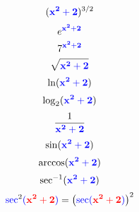 \documentclass{siproblemset}
\newcommand{\inside}{\mathbf{\color{blue} x^2+2}}
\begin{document}
    \Large
    \begin{multicols}{3}\noindent
        $$(\inside)^{3/2}$$
        \tinysp
        $$e^{\inside}$$
        \tinysp
        $$7^{\inside}$$
        \tinysp
        $$\sqrt{\inside}$$
        \columnbreak
        $$\ln(\inside)$$
        \tinysp
        $$\log_2(\inside)$$
        \tinysp
        $$\dfrac{1}{\inside}$$
        \columnbreak
        $$\sin(\inside)$$
        \tinysp
        $$\arccos(\inside)$$
        \tinysp
        $$\sec^{-1}(\inside)$$
        \tinysp
        $$\mathbf{\color{blue}\sec}^2\mathbf{\color{blue}(}\mathbf{\color{red}x^2+2}\mathbf{\color{blue})}=\left(\mathbf{\color{blue}\sec(}\mathbf{\color{red}x^2+2}\mathbf{\color{blue})}\right)^2$$
    \end{multicols}
\end{document}
